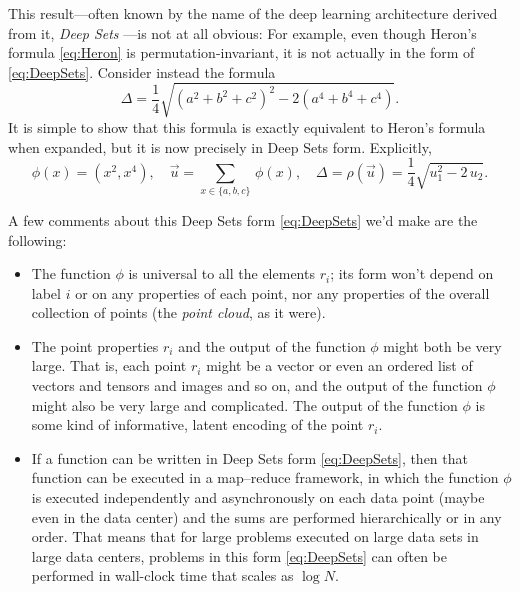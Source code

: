 \documentclass[12pt]{article}
\begin{document}
This result---often known by the name of the deep learning architecture derived from it, \emph{Deep Sets} \citep{zaheer+17deepsets}---is not at all obvious:
For example, even though Heron's formula \eqref{eq:Heron} is permutation-invariant, it is not actually in the form of \eqref{eq:DeepSets}. Consider instead the formula
\begin{equation}
    \Delta = \frac{1}{4} \sqrt{
        \left( a^2 + b^2 + c^2 \right)^2
        - 2 \left( a^4 + b^4 + c^4 \right)
    }.
\end{equation}
It is simple to show that this formula is exactly equivalent to Heron's formula when expanded, but it is now precisely in Deep Sets form. Explicitly,
\begin{equation}
    \phi(x) = (x^2, x^4), \quad
    \vec{u} = {\textstyle \sum_{x \in \{ a, b, c \}}} \, \phi(x), \quad
    \Delta = \rho(\vec{u}) = \frac{1}{4} \sqrt{ u_1^2 - 2 \, u_2 }.
\end{equation}

A few comments about this Deep Sets form \eqref{eq:DeepSets} we'd make are the following:
\begin{itemize}
    \item The function $\phi$ is universal to all the elements $r_i$; its form won't depend on label $i$ or on any properties of each point, nor any properties of the overall collection of points (the \emph{point cloud}, as it were).
    \item The point properties $r_i$ and the output of the function $\phi$ might both be very large.
    That is, each point $r_i$ might be a vector or even an ordered list of vectors and tensors and images and so on, and the output of the function $\phi$ might also be very large and complicated.
    The output of the function $\phi$ is some kind of informative, latent encoding of the point $r_i$.
    \item If a function can be written in Deep Sets form \eqref{eq:DeepSets}, then that function can be executed in a map--reduce framework, in which the function $\phi$ is executed independently and asynchronously on each data point (maybe even in the data center) and the sums are performed hierarchically or in any order.
    That means that for large problems executed on large data sets in large data centers, problems in this form \eqref{eq:DeepSets} can often be performed in wall-clock time that scales as $\log N$.
\end{itemize}
\end{document}
